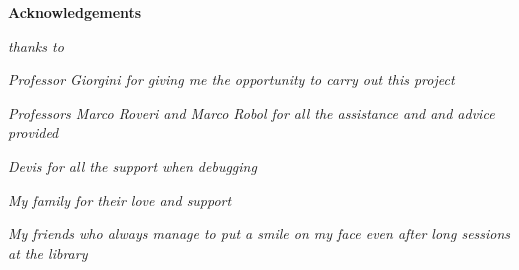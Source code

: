\thispagestyle{empty}

\begin{center}
  {\bf \Huge Acknowledgements}
\end{center}

\vspace{4cm}

\emph{
 thanks to
}

\vspace{3cm}

\emph{Professor Giorgini for giving me the opportunity to carry out this project}

\vspace{3cm}

\emph{Professors Marco Roveri and Marco Robol for all the assistance and and advice provided}

\vspace{3cm}

\emph{Devis for all the support when debugging}

\vspace{3cm}

\emph{My family for their love and support}

\vspace{3cm}

\emph{My friends who always manage to put a smile on my face even after long sessions at the library}